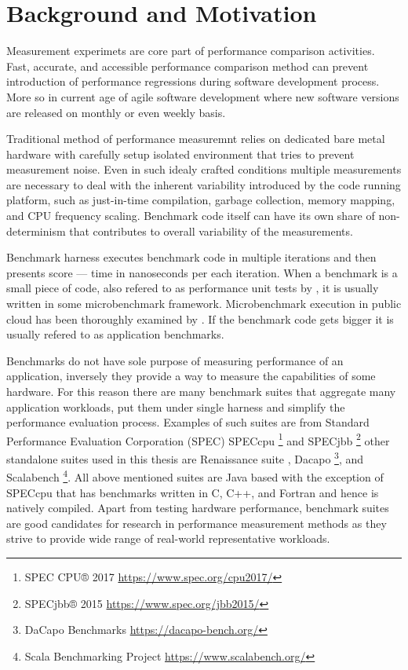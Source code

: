 \chapter{Background and Motivation}
\label{chap:background}

Measurement experimets are core part of performance comparison activities.
Fast, accurate, and accessible  performance comparison method can prevent introduction of performance regressions during software development process.
More so in current age of agile software development where new software versions are released on monthly or even weekly basis.

Traditional method of performance measuremnt relies on dedicated bare metal hardware with carefully setup isolated environment that tries to prevent measurement noise. 
Even in such idealy crafted conditions multiple measurements are necessary to deal with the inherent variability introduced by the code running platform, such as just-in-time compilation, garbage collection, memory mapping, and CPU frequency scaling.
Benchmark code itself can have its own share of non-determinism that contributes to overall variability of the measurements.

Benchmark harness executes benchmark code in multiple iterations and then presents score --- time in nanoseconds per each iteration.
When a benchmark is a small piece of code, also refered to as performance unit tests by \citet{horky2015unit}, it is usually written in some microbenchmark framework.
Microbenchmark execution in public cloud has been thoroughly examined by \citet{laaber2019software}.
If the benchmark code gets bigger it is usually refered to as application benchmarks.

Benchmarks do not have sole purpose of measuring performance of an application, inversely they provide a way to measure the capabilities of some hardware.
For this reason there are many benchmark suites that aggregate many application workloads, put them under single harness and simplify the performance evaluation process.
Examples of such suites are from Standard Performance Evaluation Corporation (SPEC) SPECcpu \footnote{SPEC CPU® 2017 \url{https://www.spec.org/cpu2017/}} and SPECjbb \footnote{SPECjbb® 2015 \url{https://www.spec.org/jbb2015/}} other standalone suites used in this thesis are Renaissance suite \cite{prokopec2019renaissance}, Dacapo \footnote{DaCapo Benchmarks \url{https://dacapo-bench.org/}}, and Scalabench \footnote{Scala Benchmarking Project \url{https://www.scalabench.org/}}.
All above mentioned suites are Java based with the exception of SPECcpu that has benchmarks written in C, C++, and Fortran and hence is natively compiled.
Apart from testing hardware performance, benchmark suites are good candidates for research in performance measurement methods as they strive to provide wide range of real-world representative workloads.

